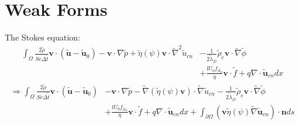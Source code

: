 \documentclass[a4paper,10pt]{article}
\begin{document}
\section{Weak Forms}
The Stokes equation: 
\begin{align}
\int_\Omega \frac{2\tilde{\rho}}{Sc\Delta\tilde{t}} \mathbf{v}\cdot\left(\tilde{\mathbf{u}}-\tilde{\mathbf{u}}_0\right) - \mathbf{v}\cdot \nabla \tilde{p} + \tilde{\eta}(\psi)\mathbf{v}\cdot\tilde{\nabla}^2\tilde{u}_{cn} &- \frac{1}{2\tilde{\lambda}_D}\tilde{\rho}_e\mathbf{v}\cdot\tilde{\nabla}\tilde{\phi}\\\nonumber
 &+\frac{l U_0 f_{it_0}}{\eta}\mathbf{v}\cdot\tilde{f}+q\nabla\cdot\tilde{\mathbf{u}}_{cn} dx
\end{align}
\begin{align}
\Rightarrow \int_\Omega \frac{2\tilde{\rho}}{Sc\Delta\tilde{t}} \mathbf{v}\cdot\left(\tilde{\mathbf{u}}-\tilde{\mathbf{u}}_0\right) &- \mathbf{v}\cdot \nabla \tilde{p} -\tilde{\nabla}\left(\tilde{\eta}(\psi)\mathbf{v}\right)\cdot\tilde{\nabla}\tilde{u}_{cn}  -\frac{1}{2\tilde{\lambda}_D}\tilde{\rho}_e\mathbf{v}\cdot\tilde{\nabla}\tilde{\phi}\\\nonumber
&+\frac{l U_0 f_{it_0}}{\eta}\mathbf{v}\cdot\tilde{f}+q\nabla\cdot\tilde{\mathbf{u}}_{cn} dx  +\int_{\partial\Omega}\left(\mathbf{v}\tilde{\eta}(\psi)\tilde{\nabla}\tilde{\mathbf{u}}_{cn}\right)\cdot\mathbf{n}ds
\end{align}
 
\end{document}
